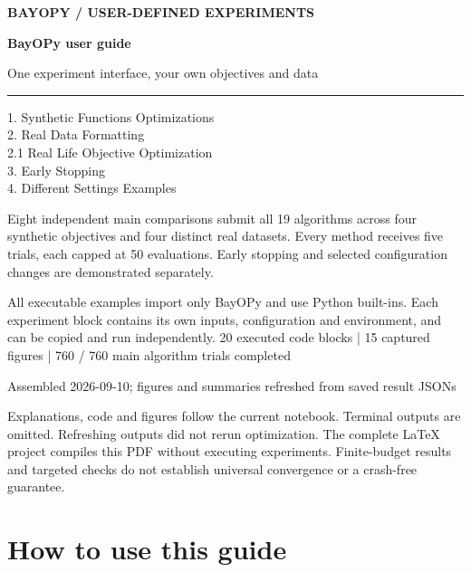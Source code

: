\documentclass[10pt,a4paper]{article}
\begin{document}
\begin{titlepage}
\vspace*{18mm}
{\small\bfseries\color{BayopyTeal}BAYOPY / USER-DEFINED EXPERIMENTS}\par
\vspace{12mm}
{\fontsize{34}{39}\selectfont\bfseries\color{BayopyInk}BayOPy user guide}\par
\vspace{5mm}
{\Large One experiment interface, your own objectives and data}\par
\vspace{9mm}
{\color{BayopyTeal}\rule{\linewidth}{2pt}}\par
\vspace{9mm}
1. Synthetic Functions Optimizations\\[5pt]
2. Real Data Formatting\\[5pt]
\hspace*{5mm}2.1 Real Life Objective Optimization\\[5pt]
3. Early Stopping\\[5pt]
4. Different Settings Examples
\vspace{9mm}

Eight independent main comparisons submit all 19 algorithms across four
synthetic objectives and four distinct real datasets. Every method receives
five trials, each capped at 50 evaluations. Early stopping and selected
configuration changes are demonstrated separately.

All executable examples import only BayOPy and use Python built-ins. Each
experiment block contains its own inputs, configuration and environment, and
can be copied and run independently.
\vfill
{\small\color{BayopyMuted}20 executed code blocks | 15 captured figures | 760 / 760 main algorithm trials completed}\par
{\small\color{BayopyMuted}Assembled 2026-09-10; figures and summaries refreshed from saved result JSONs}\par
{\small\color{BayopyMuted}Explanations, code and figures follow the current notebook. Terminal outputs are omitted.
Refreshing outputs did not rerun optimization. The complete LaTeX project compiles this PDF
without executing experiments. Finite-budget results and targeted checks do
not establish universal convergence or a crash-free guarantee.}\par
\end{titlepage}
\setcounter{tocdepth}{2}
\tableofcontents
\clearpage


\section*{How to use this guide}
\end{document}
